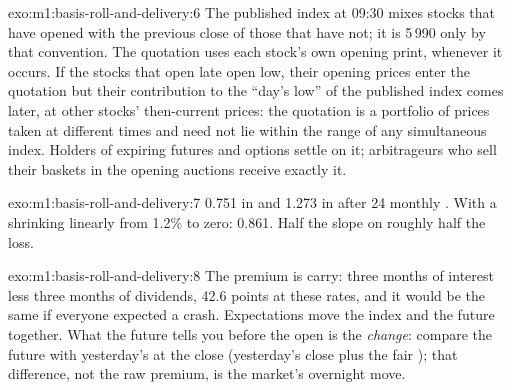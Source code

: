 \begin{solution}{exo:m1:basis-roll-and-delivery:6}
The published index at 09:30 mixes stocks that have opened with the
previous close of those that have not; it is 5\,990 only by that convention.
The quotation uses each stock's own opening print, whenever it occurs. If
the stocks that open late open low, their opening prices enter the
quotation but their contribution to the ``day's low'' of the published index
comes later, at other stocks' then-current prices: the quotation is a
portfolio of prices taken at different times and need not lie within the
range of any simultaneous index. Holders of expiring futures and options
settle on it; arbitrageurs who sell their baskets in the opening auctions
receive exactly it.
\end{solution}

\begin{solution}{exo:m1:basis-roll-and-delivery:7}
0.751 in  and 1.273 in  after 24 monthly . With a
 shrinking linearly from 1.2\% to zero: 0.861. Half the slope on
 roughly half the loss.
\end{solution}

\begin{solution}{exo:m1:basis-roll-and-delivery:8}
The premium is carry: three months of interest less three months of
dividends, 42.6 points at these rates, and it would be the same if everyone
expected a crash. Expectations move the index and the future together. What
the future tells you before the open is the \emph{change}: compare the
future with yesterday's  at the close (yesterday's close plus the
fair ); that difference, not the raw premium, is the market's overnight
move.
\end{solution}

